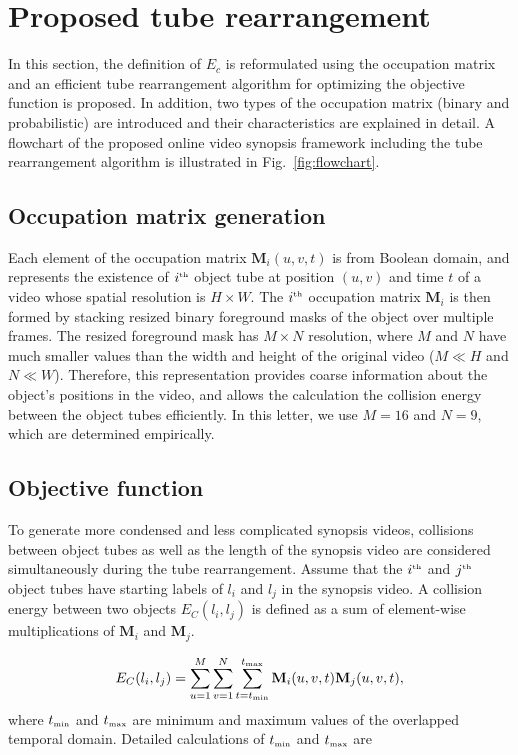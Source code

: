 \documentclass[11pt]{hyu_thesis}
\begin{document}
\section{Proposed tube rearrangement}
\label{sec:rearr}
In this section, the definition of $E_c$ is reformulated using the occupation matrix and an efficient tube rearrangement algorithm for optimizing the objective function is proposed. In addition, two types of the occupation matrix (binary and probabilistic) are introduced and their characteristics are explained in detail. A flowchart of the proposed online video synopsis framework including the tube rearrangement algorithm is illustrated in Fig.~\ref{fig:flowchart}.

\subsection{Occupation matrix generation}
\label{sec:occ_mat_gen}
Each element of the occupation matrix $\textbf{M}_i (u,v,t)$ is from Boolean domain, and represents the existence of $i^\textrm{\tiny{th}}$ object tube at position $(u,v)$ and time $t$ of a video whose spatial resolution is $H \times W$. The $i^\textrm{\tiny{th}}$ occupation matrix $\textbf{M}_i$ is then formed by stacking resized binary foreground masks of the object over multiple frames. The resized foreground mask has $M \times N$ resolution, where $M$ and $N$ have much smaller values than the width and height of the original video ($M \ll H$ and $N \ll W$). Therefore, this representation provides coarse information about the object's positions in the video, and allows the calculation the collision energy between the object tubes efficiently. In this letter, we use $M=16$ and $N=9$, which are determined empirically.

\subsection{Objective function}
To generate more condensed and less complicated synopsis videos, collisions between object tubes as well as the length of the synopsis video are considered simultaneously during the tube rearrangement. Assume that the $i^\textrm{\tiny{th}}$ and $j^\textrm{\tiny{th}}$ object tubes have starting labels of $l_i$ and $l_j$ in the synopsis video. A collision energy between two objects $E_C (l_i,l_j)$ is defined as a sum of element-wise multiplications of $\textbf{M}_i$ and $\textbf{M}_j$.

\begin{equation}
\label{eq:collision_cost}
E_C(l_i,l_j) = \sum_{u=1}^{M}\sum_{v=1}^{N}\sum_{t=t_\textrm{\tiny{min}}}^{t_\textrm{\tiny{max}}} \textbf{M}_i(u,v,t)\textbf{M}_j(u,v,t),
\end{equation}
where $t_\textrm{\tiny{min}}$ and $t_\textrm{\tiny{max}}$ are minimum and maximum values of the overlapped temporal domain. Detailed calculations of $t_\textrm{\tiny{min}}$ and $t_\textrm{\tiny{max}}$ are
\end{document}
